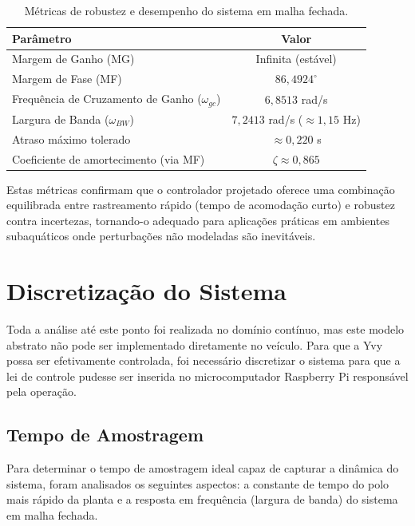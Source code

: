 \documentclass[12pt, a4paper]{article}
\begin{document}
						\begin{table}[H]
							\centering
							\caption{Métricas de robustez e desempenho do sistema em malha fechada.}
							\begin{tabular}{|l|c|}
								\hline
								\textbf{Parâmetro} & \textbf{Valor} \\
								\hline
								Margem de Ganho (MG) & Infinita (estável) \\
								Margem de Fase (MF) & $86{,}4924^\circ$ \\
								Frequência de Cruzamento de Ganho ($\omega_{gc}$) & $6{,}8513$ rad/s \\
								Largura de Banda ($\omega_{BW}$) & $7{,}2413$ rad/s ($\approx 1{,}15$ Hz) \\
								Atraso máximo tolerado & $\approx 0{,}220$ s \\
								Coeficiente de amortecimento (via MF) & $\zeta \approx 0{,}865$ \\
								\hline
							\end{tabular}
							\label{tab:metricas_robustez}
						\end{table}

						Estas métricas confirmam que o controlador projetado oferece uma combinação equilibrada entre rastreamento rápido (tempo de acomodação curto) e robustez contra incertezas, tornando-o adequado para aplicações práticas em ambientes subaquáticos onde perturbações não modeladas são inevitáveis.

	\section{Discretização do Sistema}

		Toda a análise até este ponto foi realizada no domínio contínuo, mas este modelo abstrato não pode ser implementado diretamente no veículo. Para que a Yvy possa ser efetivamente controlada, foi necessário discretizar o sistema para que a lei de controle pudesse ser inserida no microcomputador Raspberry Pi responsável pela operação.

		\subsection{Tempo de Amostragem}
			
			Para determinar o tempo de amostragem ideal capaz de capturar a dinâmica do sistema, foram analisados os seguintes aspectos: a constante de tempo do polo mais rápido da planta e a resposta em frequência (largura de banda) do sistema em malha fechada.
\end{document}

